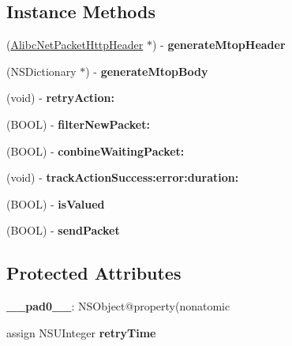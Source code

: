 \subsection*{Instance Methods}
\begin{DoxyCompactItemize}
\item 
\mbox{\label{interface_alibc_net_packet_ae28e2d689adc1e3e3c0be7a7d4d000ac}} 
(\mbox{\hyperlink{interface_alibc_net_packet_http_header}{Alibc\+Net\+Packet\+Http\+Header}} $\ast$) -\/ {\bfseries generate\+Mtop\+Header}
\item 
\mbox{\label{interface_alibc_net_packet_abce8cdfc656cceb413b1cbd859a30bf0}} 
(N\+S\+Dictionary $\ast$) -\/ {\bfseries generate\+Mtop\+Body}
\item 
\mbox{\label{interface_alibc_net_packet_ad2a032e61bb50601311731165beb3bd6}} 
(void) -\/ {\bfseries retry\+Action\+:}
\item 
\mbox{\label{interface_alibc_net_packet_a40bf634553efd76d24b9be2332ff957f}} 
(B\+O\+OL) -\/ {\bfseries filter\+New\+Packet\+:}
\item 
\mbox{\label{interface_alibc_net_packet_afd5a39735b47268babcddd68aab4d64a}} 
(B\+O\+OL) -\/ {\bfseries conbine\+Waiting\+Packet\+:}
\item 
\mbox{\label{interface_alibc_net_packet_aabed95fbe5cd33c40ca3fb7d367045b9}} 
(void) -\/ {\bfseries track\+Action\+Success\+:error\+:duration\+:}
\item 
\mbox{\label{interface_alibc_net_packet_af18b566637e71f17daf7fbfbd9efebb3}} 
(B\+O\+OL) -\/ {\bfseries is\+Valued}
\item 
\mbox{\label{interface_alibc_net_packet_a47b290c6efd19effb71dc621d60aee8b}} 
(B\+O\+OL) -\/ {\bfseries send\+Packet}
\end{DoxyCompactItemize}
\subsection*{Protected Attributes}
\begin{DoxyCompactItemize}
\item 
\mbox{\label{interface_alibc_net_packet_af99f900f2522304d4e7827faac0cb8fb}} 
{\bfseries \+\_\+\+\_\+pad0\+\_\+\+\_\+}\+: N\+S\+Object@property(nonatomic
\item 
\mbox{\label{interface_alibc_net_packet_a5928ef807436e2f71905f9c52b1f24b9}} 
assign N\+S\+U\+Integer {\bfseries retry\+Time}
\end{DoxyCompactItemize}
